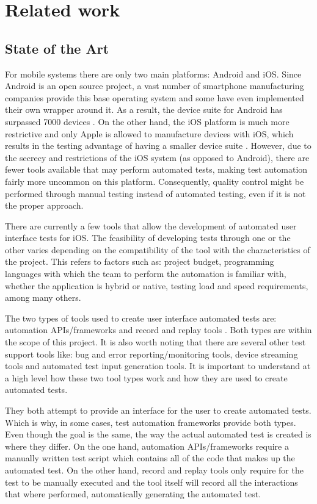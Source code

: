 \chapter{Related work}
\label{chapter2}

\section{State of the Art}

For mobile systems there are only two main platforms: Android and iOS. Since Android is an open source project, a vast number of smartphone manufacturing companies provide this base operating system and some have even implemented their own wrapper around it. As a result, the device suite for Android has surpassed 7000 devices \cite{Android-Devices}. On the other hand, the iOS platform is much more restrictive and only Apple is allowed to manufacture devices with iOS, which results in the testing advantage of having a smaller device suite \cite{Apple-Devices}. However, due to the secrecy and restrictions of the iOS system (as opposed to Android), there are fewer tools available that may perform automated tests, making test automation fairly more uncommon on this platform. Consequently, quality control might be performed through manual testing instead of automated testing, even if it is not the proper approach.

There are currently a few tools that allow the development of automated user interface tests for iOS. The feasibility of developing tests through one or the other varies depending on the compatibility of the tool with the characteristics of the project. This refers to factors such as: project budget, programming languages with which the team to perform the automation is familiar with, whether the application is hybrid or native, testing load and speed requirements, among many others.

The two types of tools used to create user interface automated tests are: automation APIs/frameworks and record and replay tools \cite{Linares-Vasquez2017ContinuousTesting}. Both types are within the scope of this project. It is also worth noting that there are several other test support tools like: bug and error reporting/monitoring tools, device streaming tools and automated test input generation tools. It is important to understand at a high level how these two tool types work and how they are used to create automated tests.

They both attempt to provide an interface for the user to create automated tests. Which is why, in some cases, test automation frameworks provide both types. Even though the goal is the same, the way the actual automated test is created is where they differ. On the one hand, automation APIs/frameworks require a manually written test script which contains all of the code that makes up the automated test. On the other hand, record and replay tools only require for the test to be manually executed and the tool itself will record all the interactions that where performed, automatically generating the automated test.


